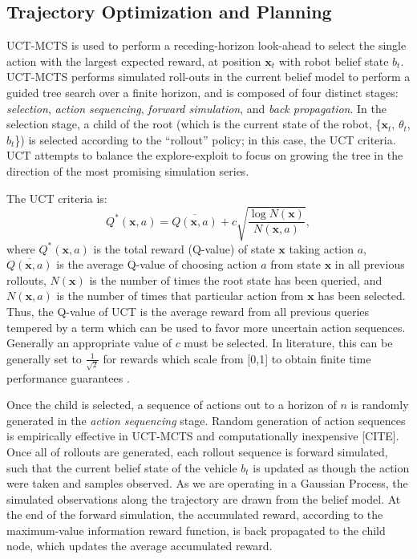 \documentclass{styles/svproc}
\newcommand{\x}{\mathbf{x}}
\begin{document}
\subsection{Trajectory Optimization and Planning}
\label{sec:mcts}
UCT-MCTS is used to perform a receding-horizon look-ahead to select the single action with the largest expected reward, at position $\x_t$ with robot belief state $b_t$. UCT-MCTS performs simulated roll-outs in the current belief model to perform a guided tree search over a finite horizon, and is composed of four distinct stages: \textit{selection}, \textit{action sequencing}, \textit{forward simulation}, and \textit{back propagation}. In the selection stage, a child of the root (which is the current state of the robot, \{$\x_t$, $\theta_t$, $b_t$\}) is selected according to the ``rollout'' policy; in this case, the UCT criteria. UCT attempts to balance the explore-exploit to focus on growing the tree in the direction of the most promising simulation series. 

The UCT criteria is:
\begin{equation}
    Q^*(\x, a) = \overline{Q(\x, a)} + c\sqrt{\frac{\log{N(\x)}}{N(\x, a)}},
\end{equation}
where $Q^*(\x, a)$ is the total reward (Q-value) of state $\x$ taking action $a$, $\overline{Q(\x, a)}$ is the average Q-value of choosing action $a$ from state $\x$ in all previous rollouts, $N(\x)$ is the number of times the root state has been queried, and $N(\x, a)$ is the number of times that particular action from $\x$ has been selected. Thus, the Q-value of UCT is the average reward from all previous queries tempered by a term which can be used to favor more uncertain action sequences. Generally an appropriate value of $c$ must be selected. In literature, this can be generally set to $\frac{1}{\sqrt{2}}$ for rewards which scale from [0,1] to obtain finite time performance guarantees \cite{kocsis2006bandit}.

Once the child is selected, a sequence of actions out to a horizon of $n$ is randomly generated in the \textit{action sequencing} stage. Random generation of action sequences is empirically effective in UCT-MCTS and computationally inexpensive [CITE]. Once all of rollouts are generated, each rollout sequence is forward simulated, such that the current belief state of the vehicle $b_t$ is updated as though the action were taken and samples observed. As we are operating in a Gaussian Process, the simulated observations along the trajectory are drawn from the belief model. At the end of the forward simulation, the accumulated reward, according to the maximum-value information reward function, is back propagated to the child node, which updates the average accumulated reward.
\end{document}
